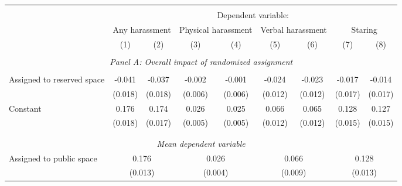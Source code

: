 \begin{tabular}{l*{8}{c}} \hline\hline \\[-1.8ex] & \multicolumn{8}{c}{Dependent variable: } \\ 
                    &\multicolumn{2}{c}{Any harassment}         &\multicolumn{2}{c}{Physical harassment}    &\multicolumn{2}{c}{Verbal harassment}      &\multicolumn{2}{c}{Staring}                \\\cmidrule(lr){2-3}\cmidrule(lr){4-5}\cmidrule(lr){6-7}\cmidrule(lr){8-9}
                    &\multicolumn{1}{c}{(1)}         &\multicolumn{1}{c}{(2)}         &\multicolumn{1}{c}{(3)}         &\multicolumn{1}{c}{(4)}         &\multicolumn{1}{c}{(5)}         &\multicolumn{1}{c}{(6)}         &\multicolumn{1}{c}{(7)}         &\multicolumn{1}{c}{(8)}         \\
 \hline \\[-1ex] \multicolumn{9}{c}{\textit{Panel A: Overall impact of randomized assignment}} \\\\[-1ex]
Assigned to reserved space&      -0.041\sym{**} &      -0.037\sym{**} &      -0.002         &      -0.001         &      -0.024\sym{*}  &      -0.023\sym{*}  &      -0.017         &      -0.014         \\
                    &     (0.018)         &     (0.018)         &     (0.006)         &     (0.006)         &     (0.012)         &     (0.012)         &     (0.017)         &     (0.017)         \\
[1em]
Constant            &       0.176\sym{***}&       0.174\sym{***}&       0.026\sym{***}&       0.025\sym{***}&       0.066\sym{***}&       0.065\sym{***}&       0.128\sym{***}&       0.127\sym{***}\\
                    &     (0.018)         &     (0.017)         &     (0.005)         &     (0.005)         &     (0.012)         &     (0.012)         &     (0.015)         &     (0.015)         \\
\\[-1.8ex] \hline \\[-1.8ex] \multicolumn{9}{c}{\textit{Mean dependent variable}} \\ Assigned to public space & \multicolumn{2}{c}{0.176} & \multicolumn{2}{c}{0.026} & \multicolumn{2}{c}{0.066} & \multicolumn{2}{c}{0.128} \\ \, & \multicolumn{2}{c}{(0.013)} & \multicolumn{2}{c}{(0.004)} & \multicolumn{2}{c}{(0.009)} & \multicolumn{2}{c}{(0.013)} \\ 


\end{tabular}
